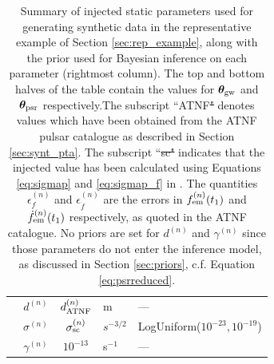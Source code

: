 \documentclass[fleqn,usenatbib,useAMS]{mnras}
\providecommand{\DIFadd}[1]{{\protect\color{blue}\uwave{#1}}} %
\providecommand{\DIFdel}[1]{{\protect\color{red}\sout{#1}}}                      %
\providecommand{\DIFaddFL}[1]{\DIFadd{#1}} %
\providecommand{\DIFdelFL}[1]{\DIFdel{#1}} %
\providecommand{\DIFaddbeginFL}{} %
\providecommand{\DIFaddendFL}{} %
\providecommand{\DIFdelbeginFL}{} %
\providecommand{\DIFdelendFL}{} %
\newcommand{\DIFscaledelfig}{0.5}
\newlength{\DIFdelgraphicswidth} %
\newlength{\DIFdelgraphicsheight} %
\newcommand{\DIFaddincludegraphics}[2][]{{\color{blue}\fbox{\DIFOincludegraphics[#1]{#2}}}} %
\newcommand{\DIFdelincludegraphics}[2][]{%
\sbox{\DIFdelgraphicsbox}{\DIFOincludegraphics[#1]{#2}}%
\settoboxwidth{\DIFdelgraphicswidth}{\DIFdelgraphicsbox} %
\settoboxtotalheight{\DIFdelgraphicsheight}{\DIFdelgraphicsbox} %
\scalebox{\DIFscaledelfig}{%
\parbox[b]{\DIFdelgraphicswidth}{\usebox{\DIFdelgraphicsbox}\\[-\baselineskip] \rule{\DIFdelgraphicswidth}{0em}}\llap{\resizebox{\DIFdelgraphicswidth}{\DIFdelgraphicsheight}{%
\setlength{\unitlength}{\DIFdelgraphicswidth}%
\begin{picture}(1,1)%
\thicklines\linethickness{2pt} %
{\color[rgb]{1,0,0}\put(0,0){\framebox(1,1){}}}%
{\color[rgb]{1,0,0}\put(0,0){\line( 1,1){1}}}%
{\color[rgb]{1,0,0}\put(0,1){\line(1,-1){1}}}%
\end{picture}%
}\hspace*{3pt}}} %
} %
\DeclareRobustCommand{\DIFaddbeginFL}{\DIFOaddbeginFL \let\includegraphics\DIFaddincludegraphics} %
\DeclareRobustCommand{\DIFaddendFL}{\DIFOaddendFL \let\includegraphics\DIFOincludegraphics} %
\DeclareRobustCommand{\DIFdelbeginFL}{\DIFOdelbeginFL \let\includegraphics\DIFdelincludegraphics} %
\DeclareRobustCommand{\DIFdelendFL}{\DIFOaddendFL \let\includegraphics\DIFOincludegraphics} %
\begin{document}
\begin{table}
\begin{tabular}{lccll}
		\DIFaddbeginFL \vspace{1mm} \DIFaddendFL &  $d^{(n)}$       &$d_{\rm ATNF}^{(n)}$  & m & --- \\
		\DIFaddbeginFL \vspace{1mm} \DIFaddendFL & $\sigma^{(n)}$              & \DIFdelbeginFL \DIFdelFL{$\sigma_{\rm sc}^{(n)}$ }\DIFdelendFL \DIFaddbeginFL \DIFaddFL{$\sigma_{\rm SC}^{(n)}$ }\DIFaddendFL & $s^{-3/2}$ & LogUniform($10^{-23}, 10^{-19}$) \\
		& $\gamma^{(n)}$              & $10^{-13}$ & s$^{-1}$ & --- \\
		\bottomrule
	\end{tabular}
	\caption{Summary of injected static parameters used for generating synthetic data in the representative example of Section \ref{sec:rep_example}, along with the prior used for Bayesian inference on each parameter (rightmost column). The top and bottom halves of the table contain the values for $\boldsymbol{\theta}_{\rm gw}$ and $\boldsymbol{\theta}_{\rm psr}$ respectively.The subscript ``ATNF\DIFdelbeginFL \DIFdelFL{" }\DIFdelendFL \DIFaddbeginFL \DIFaddFL{'' }\DIFaddendFL denotes values which have been obtained from the ATNF pulsar catalogue as described in Section \ref{sec:synt_pta}. The subscript ``\DIFdelbeginFL \DIFdelFL{sc" }\DIFdelendFL \DIFaddbeginFL \DIFaddFL{SC'' }\DIFaddendFL indicates that the injected value has been calculated using Equations \eqref{eq:sigmap} and \eqref{eq:sigmap_f} in \protect \cite{Shannon2010}. The quantities \DIFdelbeginFL \DIFdelFL{$\epsilon^{(n)}_{f}$ }\DIFdelendFL \DIFaddbeginFL \DIFaddFL{$\eta^{(n)}_{f}$ }\DIFaddendFL and \DIFdelbeginFL \DIFdelFL{$\epsilon^{(n)}_{\dot{f}}$ }\DIFdelendFL \DIFaddbeginFL \DIFaddFL{$\eta^{(n)}_{\dot{f}}$ }\DIFaddendFL are the errors in $f^{(n)}_{\rm em} (t_1)$ and $\dot{f}^{(n)}_{\rm em} (t_1)$ respectively, as quoted in the ATNF catalogue. No priors are set for $d^{(n)}$ and $\gamma^{(n)}$ since those parameters do not enter the inference model,  as discussed in Section \ref{sec:priors}, c.f. Equation \eqref{eq:psrreduced}.
}
	\label{tab:parameters_and_priors}
\end{table}
\end{document}

